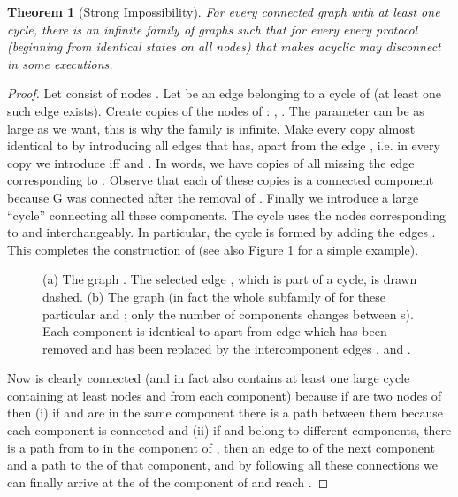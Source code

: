 \documentclass[preprint]{elsarticle}
\newtheorem{theorem}{Theorem}
\begin{document}
\begin{theorem} [Strong Impossibility] \label{the:strong-impossibility}
For every connected graph  with at least one cycle, there is an infinite family of graphs  such that for every  every protocol (beginning from identical states on all nodes) that makes  acyclic may disconnect  in some executions.
\end{theorem}
\begin{proof}
Let  consist of  nodes . Let  be an edge
belonging to a cycle of  (at least one such edge exists). Create 
copies of the nodes of : , 
. The parameter  can be as large as we want, this is why
the family  is infinite. Make every copy almost identical to  by
introducing all edges that  has, apart from the edge , i.e. in
every copy  we introduce  iff
 and  . In words, we have  copies
of  all missing the edge corresponding to . Observe that each of
these copies is a connected component because G was connected after the
removal of . Finally we introduce a large ``cycle'' connecting all
these components. The cycle uses the nodes corresponding to  and 
interchangeably. In particular, the cycle is formed by adding the edges
. This completes the
construction of  (see also Figure \ref{fig:impossibility} for a simple example).

\begin{figure}[!hbtp]
   \caption{(a) The graph . The selected edge , which is part of a cycle, is drawn dashed. (b) The graph  (in fact the whole subfamily of  for these particular  and ; only the number of components changes between s). Each component is identical to  apart from edge  which has been removed and has been replaced by the intercomponent edges ,  and .} \label{fig:impossibility}
\end{figure}

Now  is clearly connected (and in fact also contains at least one large
cycle containing at least nodes  and  from each component) because if
 are two nodes of  then (i) if  and  are in the same component there is
a path between them because each component is connected and (ii) if  and
 belong to different components, there is a path from  to  in the
component of , then an edge to  of the next component and a path to the
 of that component, and by following all these  connections we can
finally arrive at the  of the component of  and reach .


\end{proof}
\end{document}
